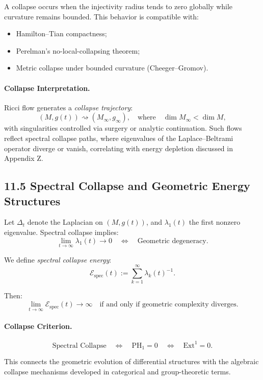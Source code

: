 \documentclass[11pt]{article}
\begin{document}
A collapse occurs when the injectivity radius tends to zero globally while curvature remains bounded. This behavior is compatible with:
\begin{itemize}
    \item Hamilton–Tian compactness;
    \item Perelman's no-local-collapsing theorem;
    \item Metric collapse under bounded curvature (Cheeger–Gromov).
\end{itemize}

\paragraph{Collapse Interpretation.}
Ricci flow generates a \emph{collapse trajectory}:
\[
(M, g(t)) \rightsquigarrow (M_\infty, g_\infty), \quad \text{where} \quad \dim M_\infty < \dim M,
\]
with singularities controlled via surgery or analytic continuation. Such flows reflect spectral collapse paths, where eigenvalues of the Laplace–Beltrami operator diverge or vanish, correlating with energy depletion discussed in Appendix Z.

\subsection*{11.5 Spectral Collapse and Geometric Energy Structures}

Let \( \Delta_t \) denote the Laplacian on \( (M, g(t)) \), and \( \lambda_1(t) \) the first nonzero eigenvalue. Spectral collapse implies:
\[
\lim_{t \to \infty} \lambda_1(t) \to 0 \quad \Leftrightarrow \quad \text{Geometric degeneracy.}
\]

We define \emph{spectral collapse energy}:
\[
\mathcal{E}_{\mathrm{spec}}(t) := \sum_{k=1}^{\infty} \lambda_k(t)^{-1}.
\]

Then:
\[
\lim_{t \to \infty} \mathcal{E}_{\mathrm{spec}}(t) \to \infty \quad \text{if and only if geometric complexity diverges.}
\]

\paragraph{Collapse Criterion.}
\[
\text{Spectral Collapse} \quad \Leftrightarrow \quad \mathrm{PH}_1 = 0 \quad \Leftrightarrow \quad \mathrm{Ext}^1 = 0.
\]

This connects the geometric evolution of differential structures with the algebraic collapse mechanisms developed in categorical and group-theoretic terms.
\end{document}
